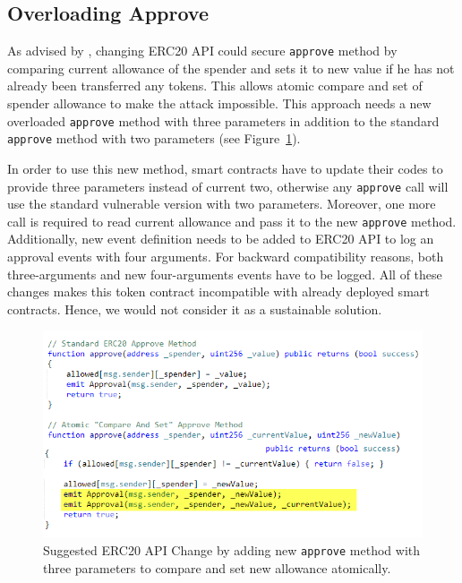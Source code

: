 \subsection{Overloading Approve}

As advised by \cite{Ref03}, changing ERC20 API could secure \texttt{approve} method by comparing current allowance of the spender and sets it to new value if he has not already been transferred any tokens. This allows atomic compare and set of spender allowance to make the attack impossible. This approach needs a new overloaded \texttt{approve} method with three parameters in addition to the standard \texttt{approve} method with two parameters (see Figure~\ref{fig:api}).

In order to use this new method, smart contracts have to update their codes to provide three parameters instead of current two, otherwise any \texttt{approve} call will use the standard vulnerable version with two parameters. Moreover, one more call is required to read current allowance and pass it to the new \texttt{approve} method. Additionally, new event definition needs to be added to ERC20 API to log an approval events with four arguments. For backward compatibility reasons, both three-arguments and new four-arguments events have to be logged. All of these changes makes this token contract incompatible with already deployed smart contracts. Hence, we would not consider it as a sustainable solution.
\begin{figure}[t]
	\centering
	\includegraphics[width=1.0\linewidth]{figures/multiple_withdrawal_12.png}
	\caption{Suggested ERC20 API Change by adding new \texttt{approve} method with three parameters to compare and set new allowance atomically.\label{fig:api}}
\end{figure}


